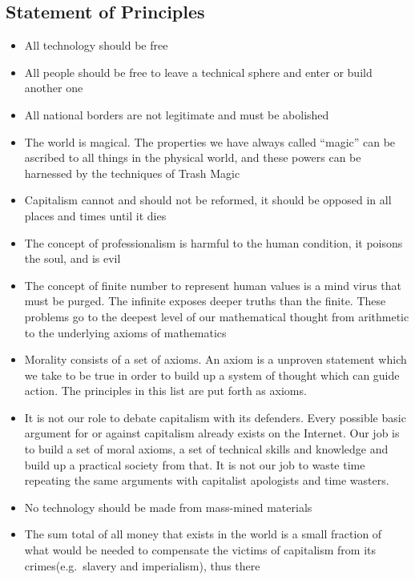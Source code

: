 \subsection{Statement of Principles}\label{statement-of-principles}

\begin{itemize}
\tightlist
\item
  All technology should be free
\item
  All people should be free to leave a technical sphere and enter or
  build another one
\item
  All national borders are not legitimate and must be abolished
\item
  The world is magical. The properties we have always called ``magic''
  can be ascribed to all things in the physical world, and these powers
  can be harnessed by the techniques of Trash Magic
\item
  Capitalism cannot and should not be reformed, it should be opposed in
  all places and times until it dies
\item
  The concept of professionalism is harmful to the human condition, it
  poisons the soul, and is evil\\
\item
  The concept of finite number to represent human values is a mind virus
  that must be purged. The infinite exposes deeper truths than the
  finite. These problems go to the deepest level of our mathematical
  thought from arithmetic to the underlying axioms of mathematics
\item
  Morality consists of a set of axioms. An axiom is a unproven statement
  which we take to be true in order to build up a system of thought
  which can guide action. The principles in this list are put forth as
  axioms.
\item
  It is not our role to debate capitalism with its defenders. Every
  possible basic argument for or against capitalism already exists on
  the Internet. Our job is to build a set of moral axioms, a set of
  technical skills and knowledge and build up a practical society from
  that. It is not our job to waste time repeating the same arguments
  with capitalist apologists and time wasters.
\item
  No technology should be made from mass-mined materials
\item
  The sum total of all money that exists in the world is a small
  fraction of what would be needed to compensate the victims of
  capitalism from its crimes(e.g.~slavery and imperialism), thus there

\end{itemize}
